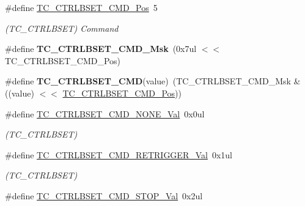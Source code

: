 \begin{DoxyCompactItemize}
\item 
\hypertarget{group___s_a_m_l21___t_c_ga300926b23e1f7430a6e8a93d73fd98cc}{}\#define \hyperlink{group___s_a_m_l21___t_c_ga300926b23e1f7430a6e8a93d73fd98cc}{T\+C\+\_\+\+C\+T\+R\+L\+B\+S\+E\+T\+\_\+\+C\+M\+D\+\_\+\+Pos}~5\label{group___s_a_m_l21___t_c_ga300926b23e1f7430a6e8a93d73fd98cc}

\begin{DoxyCompactList}\small\item\em (T\+C\+\_\+\+C\+T\+R\+L\+B\+S\+E\+T) Command \end{DoxyCompactList}\item 
\hypertarget{group___s_a_m_l21___t_c_ga6a550608ebf046c273f725f855c10ed4}{}\#define {\bfseries T\+C\+\_\+\+C\+T\+R\+L\+B\+S\+E\+T\+\_\+\+C\+M\+D\+\_\+\+Msk}~(0x7ul $<$$<$ T\+C\+\_\+\+C\+T\+R\+L\+B\+S\+E\+T\+\_\+\+C\+M\+D\+\_\+\+Pos)\label{group___s_a_m_l21___t_c_ga6a550608ebf046c273f725f855c10ed4}

\item 
\hypertarget{group___s_a_m_l21___t_c_gac834b6f4e74030fc57bd56fd2d5f3105}{}\#define {\bfseries T\+C\+\_\+\+C\+T\+R\+L\+B\+S\+E\+T\+\_\+\+C\+M\+D}(value)~(T\+C\+\_\+\+C\+T\+R\+L\+B\+S\+E\+T\+\_\+\+C\+M\+D\+\_\+\+Msk \& ((value) $<$$<$ \hyperlink{group___s_a_m_l21___t_c_ga300926b23e1f7430a6e8a93d73fd98cc}{T\+C\+\_\+\+C\+T\+R\+L\+B\+S\+E\+T\+\_\+\+C\+M\+D\+\_\+\+Pos}))\label{group___s_a_m_l21___t_c_gac834b6f4e74030fc57bd56fd2d5f3105}

\item 
\hypertarget{group___s_a_m_l21___t_c_gaa843c0929ee48527e9f3f6ffb9e3246f}{}\#define \hyperlink{group___s_a_m_l21___t_c_gaa843c0929ee48527e9f3f6ffb9e3246f}{T\+C\+\_\+\+C\+T\+R\+L\+B\+S\+E\+T\+\_\+\+C\+M\+D\+\_\+\+N\+O\+N\+E\+\_\+\+Val}~0x0ul\label{group___s_a_m_l21___t_c_gaa843c0929ee48527e9f3f6ffb9e3246f}

\begin{DoxyCompactList}\small\item\em (T\+C\+\_\+\+C\+T\+R\+L\+B\+S\+E\+T) \end{DoxyCompactList}\item 
\hypertarget{group___s_a_m_l21___t_c_gad87065a7d932e5e64d901a09e38552e6}{}\#define \hyperlink{group___s_a_m_l21___t_c_gad87065a7d932e5e64d901a09e38552e6}{T\+C\+\_\+\+C\+T\+R\+L\+B\+S\+E\+T\+\_\+\+C\+M\+D\+\_\+\+R\+E\+T\+R\+I\+G\+G\+E\+R\+\_\+\+Val}~0x1ul\label{group___s_a_m_l21___t_c_gad87065a7d932e5e64d901a09e38552e6}

\begin{DoxyCompactList}\small\item\em (T\+C\+\_\+\+C\+T\+R\+L\+B\+S\+E\+T) \end{DoxyCompactList}\item 
\hypertarget{group___s_a_m_l21___t_c_gaa4a9a321dfc02191674396c7a2af47a4}{}\#define \hyperlink{group___s_a_m_l21___t_c_gaa4a9a321dfc02191674396c7a2af47a4}{T\+C\+\_\+\+C\+T\+R\+L\+B\+S\+E\+T\+\_\+\+C\+M\+D\+\_\+\+S\+T\+O\+P\+\_\+\+Val}~0x2ul\label{group___s_a_m_l21___t_c_gaa4a9a321dfc02191674396c7a2af47a4}


\end{DoxyCompactItemize}

